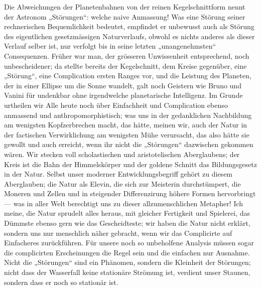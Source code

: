 Die Abweichungen der Planetenbahnen von der reinen Kegelschnittform nennt der Astronom „Störungen“: welche naive Anmassung! Was eine Störung seiner rechnerischen Bequemlichkeit bedeutet, empfindet er unbewusst auch als Störung des eigentlichen gesetzmässigen Naturverlaufs, obwohl es nichts anderes als dieser Verlauf selber ist, nur verfolgt bis in seine letzten „unangenehmsten“ Consequenzen. Früher war man, der grösseren Unwissenheit entsprechend, noch unbescheidener; da stellte bereits der Kegelschnitt, dem Kreise gegenüber, eine „Störung“, eine Complication ersten Ranges vor, und die Leistung des Planeten, der in einer Ellipse um die Sonne wandelt, galt noch Geistern wie Bruno und Vanini für undenkbar ohne irgendwelche planetarische Intelligenz. Im Grunde urtheilen wir Alle heute noch über Einfachheit und Complication ebenso anmassend und anthropomorphistisch; was uns in der gedanklichen Nachbildung am wenigsten Kopfzerbrechen macht, das hätte, meinen wir, auch der Natur in der factischen Verwirklichung am wenigsten Mühe verursacht, das also hätte sie  gewollt und auch erreicht, wenn ihr nicht die „Störungen“ dazwischen gekommen wären. Wir stecken voll scholastischen und aristotelischen Aberglaubens; der Kreis ist  die Bahn der Himmelskörper und der goldene Schnitt das  Bildungsgesetz in der Natur. Selbst unser moderner Entwicklungsbegriff gehört zu diesem Aberglauben; die Natur als Elevin, die sich zur Meisterin durchstümpert, die  Moneren und Zellen und  in steigender Differenzirung höhere Formen hervorbringt — was in aller Welt berechtigt uns zu dieser allzumenschlichen Metapher! Ich meine, die Natur sprudelt alles heraus, mit gleicher Fertigkeit und Spielerei, das Dümmste ebenso gern wie das Gescheidteste; wir haben die Natur nicht erklärt, sondern uns nur menschlich näher gebracht, wenn wir das Complicirte auf Einfacheres zurückführen. Für unsere noch so unbeholfene Analysis müssen sogar die complicirten Erscheinungen die Regel sein und die einfachen nur Ausnahme. Nicht die „Störungen“ sind ein Phänomen, sondern die Kleinheit der Störungen; nicht dass der Wasserfall keine stationäre Strömung ist, verdient unser Staunen, sondern dass er noch so  stationär ist.
\par

